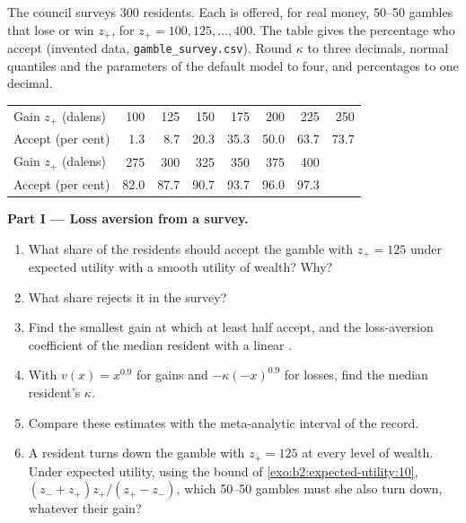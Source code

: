 \begin{problem}
\label{pb:b2:behavioural-evidence:1}
The council surveys 300 residents. Each is offered, for real money, 50--50 gambles that lose 
or win $z_+$, for $z_+ = 100, 125, \dots, 400$. The table gives the percentage who accept (invented
data, \texttt{gamble\_survey.csv}). Round $\kappa$ to three decimals, normal quantiles and the
parameters of the default model to four, and percentages to one decimal.

\begin{center}
\small
\begin{tabular}{l*{7}{r}}
\toprule
Gain $z_+$ (dalens) & 100 & 125 & 150 & 175 & 200 & 225 & 250 \\
Accept (per cent) & 1.3 & 8.7 & 20.3 & 35.3 & 50.0 & 63.7 & 73.7 \\
\midrule
Gain $z_+$ (dalens) & 275 & 300 & 325 & 350 & 375 & 400 & \\
Accept (per cent) & 82.0 & 87.7 & 90.7 & 93.7 & 96.0 & 97.3 & \\
\bottomrule
\end{tabular}
\end{center}

\medskip
\noindent\textbf{Part I --- Loss aversion from a survey.}
\begin{enumerate}
  \item What share of the residents should accept the gamble with $z_+ = 125$ under expected utility
        with a smooth utility of wealth? Why?
  \item What share rejects it in the survey?
  \item Find the smallest gain at which at least half accept, and the loss-aversion coefficient of the
        median resident with a linear .
  \item With $v(x) = x^{0.9}$ for gains and $-\kappa(-x)^{0.9}$ for losses, find the median resident's
        $\kappa$.
  \item Compare these estimates with the meta-analytic interval of the record.
  \item A resident turns down the gamble with $z_+ = 125$ at every level of wealth. Under expected
        utility, using the bound of \cref{exo:b2:expected-utility:10}, $(z_- + z_+)z_+/(z_+ - z_-)$, which
        50--50 gambles must she also turn down, whatever their gain?
\end{enumerate}


\end{problem}
